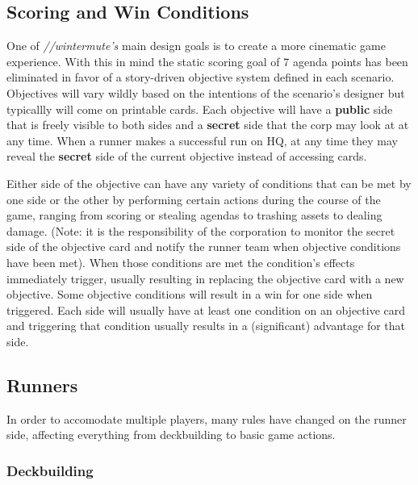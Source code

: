 \documentclass[titlepage]{article}
\begin{document}
	\subsection{Scoring and Win Conditions}

		One of \emph{//wintermute's} main design goals is to create a more cinematic game experience. With this in mind the static scoring goal of 7 agenda points has been eliminated in favor of a story-driven objective system defined in each scenario. Objectives will vary wildly based on the intentions of the scenario's designer but typicallly will come on printable cards. Each objective will have a \textbf{public} side that is freely visible to both sides and a \textbf{secret} side that the corp may look at at any time. When a runner makes a successful run on HQ, at any time they may reveal the \textbf{secret} side of the current objective instead of accessing cards.

		Either side of the objective can have any variety of conditions that can be met by one side or the other by performing certain actions during the course of the game, ranging from scoring or stealing agendas to trashing assets to dealing damage. (Note: it is the responsibility of the corporation to monitor the secret side of the objective card and notify the runner team when objective conditions have been met). When those conditions are met the condition's effects immediately trigger, usually resulting in replacing the objective card with a new objective. Some objective conditions will result in a win for one side when triggered. Each side will usually have at least one condition on an objective card and triggering that condition usually results in a (significant) advantage for that side.

	\subsection{Runners}

		In order to accomodate multiple players, many rules have changed on the runner side, affecting everything from deckbuilding to basic game actions.

		\subsubsection{Deckbuilding}
\end{document}
